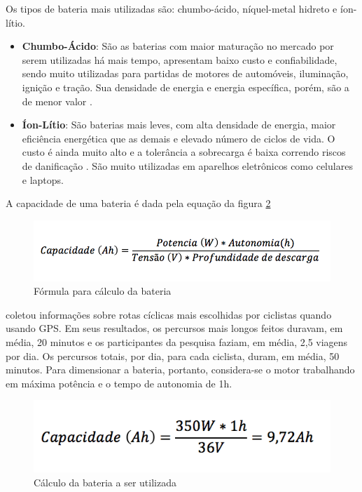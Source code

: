 	Os tipos de bateria mais utilizadas são: chumbo-ácido, níquel-metal hidreto e íon-lítio.
	
	\begin{itemize}
		\item \textbf{Chumbo-Ácido}: São as baterias com maior maturação no mercado por serem utilizadas há mais tempo, apresentam baixo custo e confiabilidade, sendo muito utilizadas para partidas de motores de automóveis, iluminação, ignição e tração. Sua densidade de energia e energia específica, porém, são a de menor valor \cite{bezerra}.
	\item \textbf{Íon-Lítio}:  São baterias mais leves, com alta densidade de energia, maior eficiência energética que as demais e elevado número de ciclos de vida. O custo é ainda muito alto e a tolerância a sobrecarga é baixa correndo riscos de danificação \cite{bezerra}. São muito utilizadas em aparelhos eletrônicos como celulares e laptops.
	\end{itemize}
	
	A capacidade de uma bateria é dada pela equação da figura \ref{img:calculo_bateria}
	
	\graphicspath{{figuras/}}
	\begin{figure}[h!]
	\centering
	\includegraphics[scale=1.0]{capacidade_bateria}
	\caption{Fórmula para cálculo da bateria}
	\label{img:formula_capacidade}
	\end{figure}
	

	 coletou informações sobre rotas cíclicas mais escolhidas por ciclistas quando usando GPS. Em seus resultados, os percursos mais longos feitos duravam, em média, 20 minutos e os participantes da pesquisa faziam, em média, 2,5 viagens por dia. Os percursos totais, por dia, para cada ciclista, duram, em média, 50 minutos. Para dimensionar a bateria, portanto, considera-se o motor trabalhando em máxima potência e o tempo de autonomia de 1h.
	
	\graphicspath{{figuras/}}
	\begin{figure}[h!]
	\centering
	\includegraphics[scale=1.0]{calculo_capacidade}
	\caption{Cálculo da bateria a ser utilizada}
	\label{img:calculo_bateria}
	\end{figure}
	
